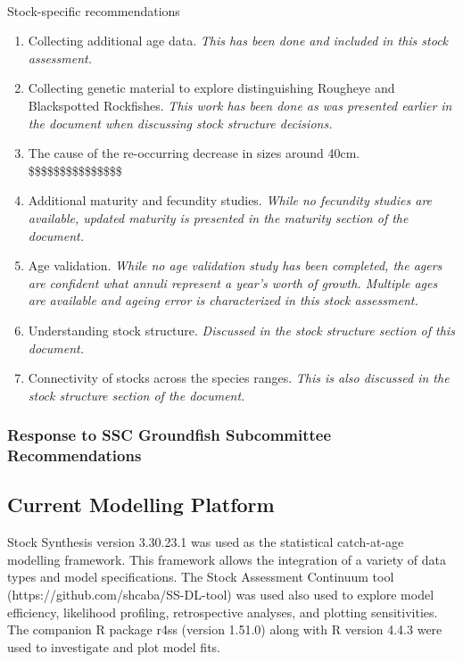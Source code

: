 \documentclass[
]{scrartcl}
\makeatletter
\let\oldparagraph\paragraph
\renewcommand{\paragraph}{
    \@ifstar
      \xxxParagraphStar
      \xxxParagraphNoStar
  }
\newcommand{\xxxParagraphStar}[1]{\oldparagraph*{#1}\mbox{}}
\newcommand{\xxxParagraphNoStar}[1]{\oldparagraph{#1}\mbox{}}
\providecommand{\tightlist}{%
  \setlength{\itemsep}{0pt}\setlength{\parskip}{0pt}}\usepackage{longtable,booktabs,array}
\makeatother
\begin{document}
\paragraph{Stock-specific
recommendations}\label{stock-specific-recommendations}

\begin{enumerate}
\def\labelenumi{\arabic{enumi}.}
\tightlist
\item
  Collecting additional age data. \emph{This has been done and included
  in this stock assessment.}
\item
  Collecting genetic material to explore distinguishing Rougheye and
  Blackspotted Rockfishes. \emph{This work has been done as was
  presented earlier in the document when discussing stock structure
  decisions.}
\item
  The cause of the re-occurring decrease in sizes around 40cm.
  \$\$\$\$\$\$\$\$\$\$\$\$\$\$\$
\item
  Additional maturity and fecundity studies. \emph{While no fecundity
  studies are available, updated maturity is presented in the maturity
  section of the document.}
\item
  Age validation. \emph{While no age validation study has been
  completed, the agers are confident what annuli represent a year's
  worth of growth. Multiple ages are available and ageing error is
  characterized in this stock assessment.}
\item
  Understanding stock structure. \emph{Discussed in the stock structure
  section of this document.}
\item
  Connectivity of stocks across the species ranges. \emph{This is also
  discussed in the stock structure section of the document.}
\end{enumerate}

\subsubsection{Response to SSC Groundfish Subcommittee
Recommendations}\label{response-to-ssc-groundfish-subcommittee-recommendations}

\subsection{Current Modelling
Platform}\label{current-modelling-platform}

Stock Synthesis version 3.30.23.1 was used as the statistical
catch-at-age modelling framework. This framework allows the integration
of a variety of data types and model specifications. The Stock
Assessment Continuum tool (https://github.com/shcaba/SS-DL-tool) was
used also used to explore model efficiency, likelihood profiling,
retrospective analyses, and plotting sensitivities. The companion R
package r4ss (version 1.51.0) along with R version 4.4.3 were used to
investigate and plot model fits.
\end{document}
